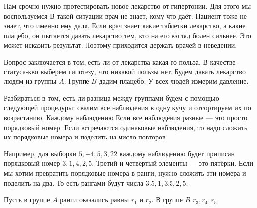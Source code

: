 \documentclass[12pt, a4paper, oneside]{article}
\begin{document}
Нам срочно нужно протестировать новое лекарство от гипертонии. Для этого мы воспользуемся  В такой ситуации врач не знает, кому что даёт. Пациент тоже не знает, что именно ему дали. Если врач знает какие таблетки лекарство, а какие плацебо, он пытается давать лекарство тем, кто на его взгляд болен сильнее. Это может исказить результат. Поэтому приходится держать врачей в неведении. 

Вопрос заключается в том, есть ли от лекарства какая-то польза. В качестве статуса-кво выберем гипотезу, что никакой пользы нет. Будем давать лекарство людям из группы $A$. Группе $B$ дадим плацебо. У всех людей измерим давление. 

Разбираться в том, есть ли разница между группами будем с помощью следующей процедуры: свалим все наблюдения в одну кучу и отсортируем их по возрастанию. Каждому наблюдению  Если все наблюдения разные --- это просто порядковый номер. Если встречаются одинаковые наблюдения, то надо сложить их порядковые номера и поделить на число повторов. 

Например, для выборки $5,-4,5,3,22$ каждому наблюдению будет приписан порядковый номер $3,1,4,2,5$. Третий и четвёртый элементы --- это пятёрки. Если мы хотим превратить порядковые номера в ранги, нужно сложить эти номера и поделить на два. То есть рангами будут числа $3.5, 1, 3.5, 2, 5$.

Пусть в группе $A$ ранги оказались равны $r_1$ и $r_2$. В группе $B$ $r_3, r_4, r_5$. 

\begin{center}
\end{center}
\end{document}
